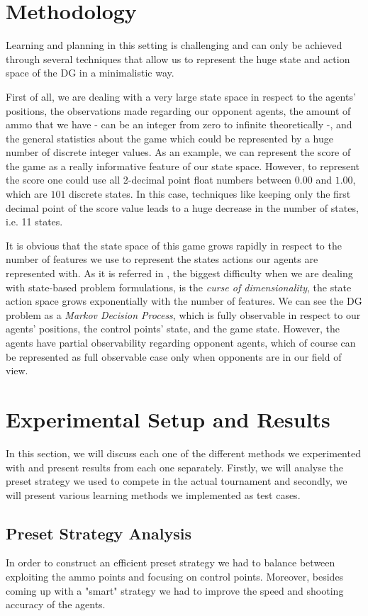 \documentclass[conference]{IEEEtran}
\begin{document}
\section{Methodology}
Learning and planning in this setting is challenging and can only be achieved through several techniques that allow us to represent the huge state and action space of the DG in a minimalistic way. 

First of all, we are dealing with a very large state space in respect to the agents' positions, the observations made regarding our opponent agents, the amount of ammo that we have - can be an integer from zero to infinite theoretically -, and the general statistics about the game which could be represented by a huge number of discrete integer values. As an example, we can represent the score of the game as a really informative feature of our state space. However, to represent the score one could use all 2-decimal point float numbers between $0.00$ and $1.00$, which are $101$ discrete states. 
In this case, techniques like keeping only the first decimal point of the score value leads to a huge decrease in the number of states, i.e. 11 states. 

It is obvious that the state space of this game grows rapidly in respect to the number of features we use to represent the states actions our agents are represented with. As it is referred in \cite{boutilier}, the biggest difficulty when we are dealing with state-based problem formulations, is the \textit{curse of dimensionality}, the state action space grows exponentially with the number of features. We can see the DG problem as a \textit{Markov Decision Process}, which is fully observable in respect to our agents' positions, the control points' state, and the game state. However, the agents have partial observability regarding opponent agents, which of course can be represented as full observable case only when opponents are in our field of view.

\section{Experimental Setup and Results}
In this section, we will discuss each one of the different methods we experimented with and present results from each one separately. Firstly, we will analyse the preset strategy we used to compete in the actual tournament and secondly, we will present various learning methods we implemented as test cases.

\subsection{Preset Strategy Analysis}
In order to construct an efficient preset strategy we had to balance between exploiting the ammo points and focusing on control points. Moreover, besides coming up with a "smart" strategy we had to improve the speed and shooting accuracy of the agents.
\end{document}
